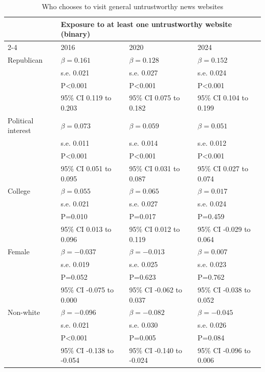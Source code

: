 \begin{table}[H]
\centering
\caption{Who chooses to visit general untrustworthy news websites}
\label{tab:sm_untrustworthy_model}
\begin{tabular}{llll}
\hline
 & \multicolumn{3}{l}{Exposure to at least one untrustworthy website (binary)} \\ 
\cline{2-4}
 & 2016 & 2020 & 2024 \\ 
\hline
\rowcolor[gray]{0.93}
Republican & $\beta=0.161$ & $\beta=0.128$ & $\beta=0.152$ \\ 
\rowcolor[gray]{0.93}
 & s.e. 0.021 & s.e. 0.027 & s.e. 0.024 \\ 
\rowcolor[gray]{0.93}
 & P<0.001 & P<0.001 & P<0.001 \\ 
\rowcolor[gray]{0.93}
 & 95\% CI 0.119 to 0.203 & 95\% CI 0.075 to 0.182 & 95\% CI 0.104 to 0.199 \\ 
Political interest & $\beta=0.073$ & $\beta=0.059$ & $\beta=0.051$ \\ 
 & s.e. 0.011 & s.e. 0.014 & s.e. 0.012 \\ 
 & P<0.001 & P<0.001 & P<0.001 \\ 
 & 95\% CI 0.051 to 0.095 & 95\% CI 0.031 to 0.087 & 95\% CI 0.027 to 0.074 \\ 
\rowcolor[gray]{0.93}
College & $\beta=0.055$ & $\beta=0.065$ & $\beta=0.017$ \\ 
\rowcolor[gray]{0.93}
 & s.e. 0.021 & s.e. 0.027 & s.e. 0.024 \\ 
\rowcolor[gray]{0.93}
 & P=0.010 & P=0.017 & P=0.459 \\ 
\rowcolor[gray]{0.93}
 & 95\% CI 0.013 to 0.096 & 95\% CI 0.012 to 0.119 & 95\% CI -0.029 to 0.064 \\ 
Female & $\beta=-0.037$ & $\beta=-0.013$ & $\beta=0.007$ \\ 
 & s.e. 0.019 & s.e. 0.025 & s.e. 0.023 \\ 
 & P=0.052 & P=0.623 & P=0.762 \\ 
 & 95\% CI -0.075 to 0.000 & 95\% CI -0.062 to 0.037 & 95\% CI -0.038 to 0.052 \\ 
\rowcolor[gray]{0.93}
Non-white & $\beta=-0.096$ & $\beta=-0.082$ & $\beta=-0.045$ \\ 
\rowcolor[gray]{0.93}
 & s.e. 0.021 & s.e. 0.030 & s.e. 0.026 \\ 
\rowcolor[gray]{0.93}
 & P<0.001 & P=0.005 & P=0.084 \\ 
\rowcolor[gray]{0.93}
 & 95\% CI -0.138 to -0.054 & 95\% CI -0.140 to -0.024 & 95\% CI -0.096 to 0.006 \\ 

\end{tabular}
\end{table}
